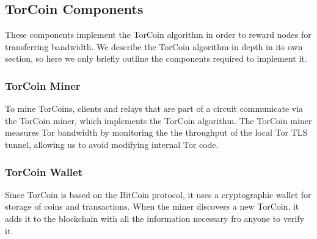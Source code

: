 \subsection{TorCoin Components} These components implement the TorCoin algorithm
in order to reward nodes for transferring bandwidth. We describe the TorCoin 
algorithm in depth in its own section, so here we only briefly outline the 
components required to implement it.

\subsubsection{TorCoin Miner} To mine TorCoins, clients and relays that are part
of a circuit communicate via the TorCoin miner, which implements the TorCoin
algorithm. The TorCoin miner measures Tor bandwidth by monitoring the the 
throughput of the local Tor TLS tunnel, allowing us to avoid modifying internal 
Tor code.

\subsubsection{TorCoin Wallet} Since TorCoin is based on the BitCoin protocol,
it uses a cryptographic wallet for storage of coins and transactions. When the
miner discovers a new TorCoin, it adds it to the blockchain with all the
information necessary fro anyone to verify it.